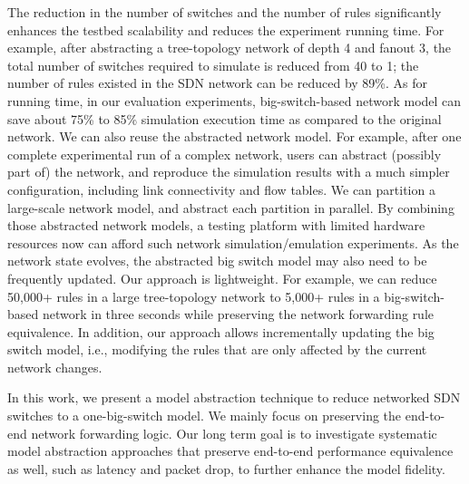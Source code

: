 The reduction in the number of switches and the number of rules significantly enhances the testbed scalability and reduces the experiment running time.
For example, after abstracting a tree-topology network of depth 4 and fanout 3,
the total number of switches required to simulate is reduced from 40 to 1;
the number of rules existed in the SDN network can be reduced by 89\%.
As for running time, in our evaluation experiments, big-switch-based network model can save about
75\% to 85\% simulation execution time as compared to the original network.
We can also reuse the abstracted network model.
For example, after one complete experimental run of a complex network,
users can abstract (possibly part of) the network, and reproduce the simulation results with
a much simpler configuration, including link connectivity and flow tables.
We can partition a large-scale network model, and abstract each partition in parallel.
By combining those abstracted network models, a testing platform with limited hardware resources
now can afford such network simulation/emulation experiments.
As the network state evolves, the abstracted big switch model may also need to be frequently updated.
Our approach is lightweight. For example, we can reduce 50,000+ rules in a large tree-topology network
to 5,000+ rules in a big-switch-based network in three seconds
while preserving the network forwarding rule equivalence.
In addition, our approach allows incrementally updating the big switch model,
i.e., modifying the rules that are only affected by the current network changes.

In this work, we present a model abstraction technique to reduce networked SDN switches to a one-big-switch model. We mainly focus on preserving the end-to-end network forwarding logic.
Our long term goal is to investigate systematic model abstraction approaches that preserve end-to-end performance equivalence as well, such as latency and packet drop, to further enhance the model fidelity.

